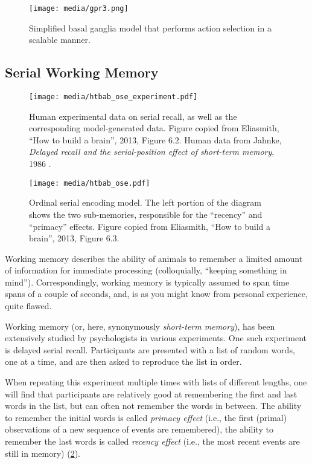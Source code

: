 \documentclass[10pt,letterpaper,oneside]{article}
\begin{document}
\begin{figure}[t]
	\centering
	\texttt{[image: media/gpr3.png]}
	\caption{Simplified basal ganglia model that performs action selection in a scalable manner.}
	\label{fig:simple_bg}
\end{figure}

\subsection{Serial Working Memory}

\begin{figure}[t]
	\centering
	\texttt{[image: media/htbab\_ose\_experiment.pdf]}
	\caption{Human experimental data on serial recall, as well as the corresponding model-generated data. Figure copied from Eliasmith, \enquote{How to build a brain}, 2013, Figure 6.2. Human data from Jahnke, \emph{Delayed recall and the serial-position effect of short-term memory}, 1986 \cite{jahnke1968delayed}.}
	\label{fig:htbab_ose_experiment}
\end{figure}

\begin{figure}[t]
	\centering
	\texttt{[image: media/htbab\_ose.pdf]}
	\caption{Ordinal serial encoding model. The left portion of the diagram shows the two sub-memories, responsible for the \enquote{recency} and \enquote{primacy} effects. Figure copied from Eliasmith, \enquote{How to build a brain}, 2013, Figure 6.3.}
	\label{fig:htbab_ose}
\end{figure}

Working memory describes the ability of animals to remember a limited amount of information for immediate processing (colloquially, \enquote{keeping something in mind}). Correspondingly, working memory is typically assumed to span time spans of a couple of seconds, and, is as you might know from personal experience, quite flawed.

Working memory (or, here, synonymously \emph{short-term memory}), has been extensively studied by psychologists in various experiments. One such experiment is delayed serial recall. Participants are presented with a list of random words, one at a time, and are then asked to reproduce the list in order.

When repeating this experiment multiple times with lists of different lengths, one will find that participants are relatively good at remembering the first and last words in the list, but can often not remember the words in between. The ability to remember the initial words is called \emph{primacy effect} (i.e., the first (primal) observations of a new sequence of events are remembered), the ability to remember the last words is called \emph{recency effect} (i.e., the most recent events are still in memory) (\cref{fig:htbab_ose_experiment}).
\end{document}
